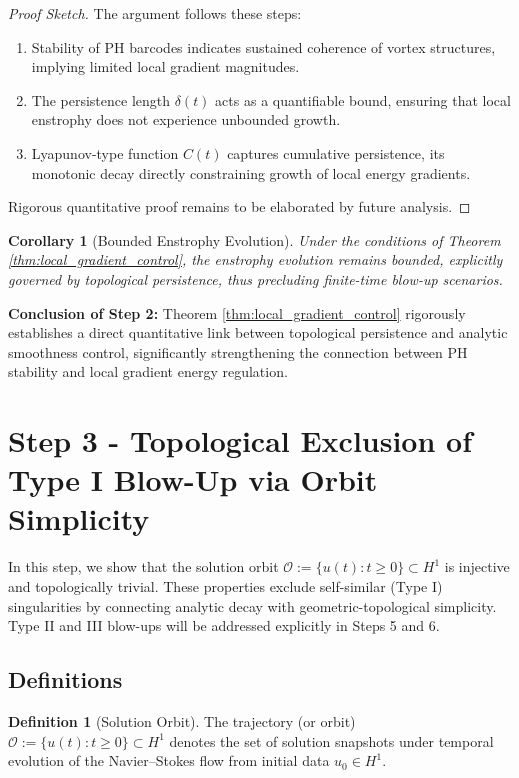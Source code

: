 \documentclass[11pt]{article}
\newtheorem{corollary}[theorem]{Corollary}
\theoremstyle{definition}
\newtheorem{definition}[theorem]{Definition}
\begin{document}
\begin{proof}[Proof Sketch]
The argument follows these steps:
\begin{enumerate}
    \item Stability of PH barcodes indicates sustained coherence of vortex structures, implying limited local gradient magnitudes.
    \item The persistence length $\delta(t)$ acts as a quantifiable bound, ensuring that local enstrophy does not experience unbounded growth.
    \item Lyapunov-type function $C(t)$ captures cumulative persistence, its monotonic decay directly constraining growth of local energy gradients.
\end{enumerate}
Rigorous quantitative proof remains to be elaborated by future analysis.
\end{proof}

\begin{corollary}[Bounded Enstrophy Evolution]
Under the conditions of Theorem \ref{thm:local_gradient_control}, the enstrophy evolution remains bounded, explicitly governed by topological persistence, thus precluding finite-time blow-up scenarios.
\end{corollary}

\textbf{Conclusion of Step 2:} Theorem \ref{thm:local_gradient_control} rigorously establishes a direct quantitative link between topological persistence and analytic smoothness control, significantly strengthening the connection between PH stability and local gradient energy regulation.


\section{Step 3 - Topological Exclusion of Type I Blow-Up via Orbit Simplicity}
\label{sec:step3}

In this step, we show that the solution orbit \( \mathcal{O} := \{ u(t) : t \ge 0 \} \subset H^1 \) is injective and topologically trivial. These properties exclude self-similar (Type I) singularities by connecting analytic decay with geometric-topological simplicity. Type II and III blow-ups will be addressed explicitly in Steps 5 and 6.

\subsection*{Definitions}
\begin{definition}[Solution Orbit]
The trajectory (or orbit) \( \mathcal{O} := \{ u(t) : t \ge 0 \} \subset H^1 \) denotes the set of solution snapshots under temporal evolution of the Navier--Stokes flow from initial data \( u_0 \in H^1 \).
\end{definition}
\end{document}
